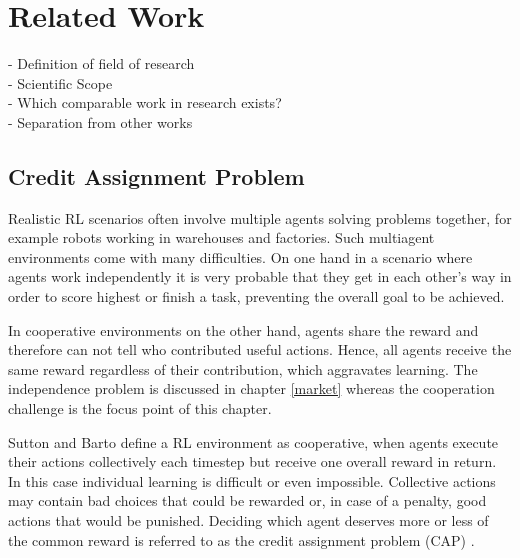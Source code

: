 %
%
\chapter{Related Work}\label{sec:RelatedWork}
- Definition of field of research \\
- Scientific Scope \\
- Which comparable work in research exists? \\
- Separation from other works

\section{Credit Assignment Problem}
Realistic RL scenarios often involve multiple agents solving problems together, for example robots working in warehouses and factories. Such multiagent environments come with many difficulties. On one hand in a scenario where agents work independently it is very probable that they get in each other's way in order to score highest or finish a task, preventing the overall goal to be achieved.

In cooperative environments on the other hand, agents share the reward and therefore can not tell who contributed useful actions. Hence, all agents receive the same reward regardless of their contribution, which aggravates learning. The independence problem is discussed in chapter \ref{market} whereas the cooperation challenge is the focus point of this chapter.

Sutton and Barto \cite{suba18} define a RL environment as cooperative, when agents execute their actions collectively each timestep but receive one overall reward in return. In this case individual learning is difficult or even impossible. Collective actions may contain bad choices that could be rewarded or, in case of a penalty, good actions that would be punished. Deciding which agent deserves more or less of the common reward is referred to as the credit assignment problem (CAP) \cite{mi61}.


